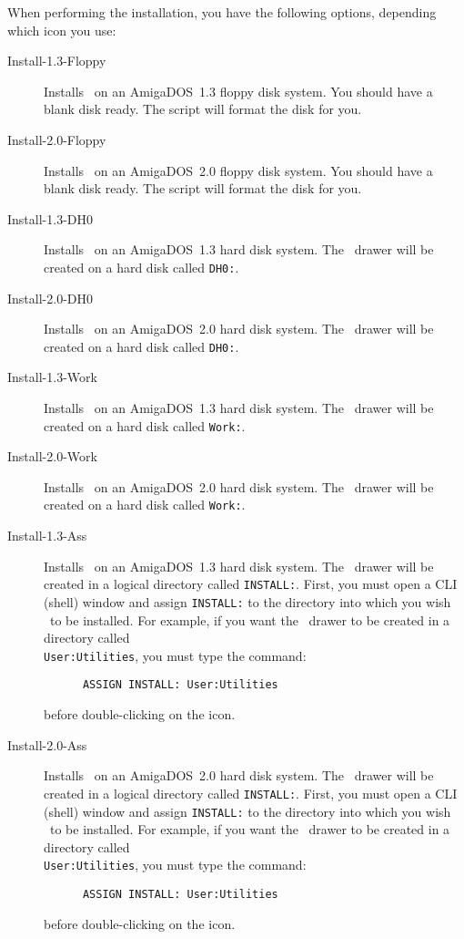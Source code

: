 When performing the installation, you have the following options, depending which 
icon you use:
\begin{description}
\item[Install-1.3-Floppy] Installs \amplot\ on an AmigaDOS~1.3 floppy disk system. 
   You should have a blank disk ready. The script will format the disk for you.
\item[Install-2.0-Floppy] Installs \amplot\ on an AmigaDOS~2.0 floppy disk system. 
   You should have a blank disk ready. The script will format the disk for you.
\item[Install-1.3-DH0] Installs \amplot\ on an AmigaDOS~1.3 hard disk system. The 
\amplot\ drawer will be created on a hard disk called {\tt DH0:}.
\item[Install-2.0-DH0] Installs \amplot\ on an AmigaDOS~2.0 hard disk system. The 
\amplot\ drawer will be created on a hard disk called {\tt DH0:}.
\item[Install-1.3-Work] Installs \amplot\ on an AmigaDOS~1.3 hard disk system. The 
\amplot\ drawer will be created on a hard disk called {\tt Work:}.
\item[Install-2.0-Work] Installs \amplot\ on an AmigaDOS~2.0 hard disk system. The 
\amplot\ drawer will be created on a hard disk called {\tt Work:}.
\item[Install-1.3-Ass] Installs \amplot\ on an AmigaDOS~1.3 hard disk system. The 
\amplot\ drawer will be created in a logical directory called {\tt INSTALL:}.
First, you must open a CLI (shell) window and assign {\tt INSTALL:} to the directory 
into which you wish \amplot\ to be installed. For example, if you want the \amplot\ 
drawer to be created in a directory called\\
{\tt User:Utilities}, you must type the command: 
\begin{verbatim}
      ASSIGN INSTALL: User:Utilities
\end{verbatim}
before double-clicking on the icon.
\item[Install-2.0-Ass] Installs \amplot\ on an AmigaDOS~2.0 hard disk system. The 
\amplot\ drawer will be created in a logical directory called {\tt INSTALL:}.
First, you must open a CLI (shell) window and assign {\tt INSTALL:} to the directory 
into which you wish \amplot\ to be installed. For example, if you want the \amplot\ 
drawer to be created in a directory called\\
{\tt User:Utilities}, you must type the command: 
\begin{verbatim}
      ASSIGN INSTALL: User:Utilities
\end{verbatim}
before double-clicking on the icon.
\end{description}

